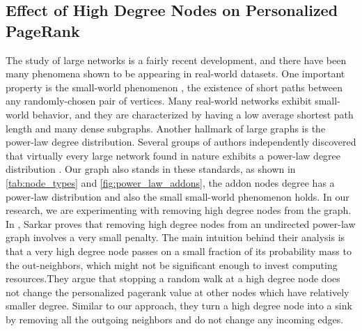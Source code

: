 \documentclass[11pt,oneside]{book}
\let\Oldsubsection\subsection
\renewcommand{\subsection}{\FloatBarrier\Oldsubsection}
\begin{document}
\subsection{Effect of High Degree Nodes on Personalized PageRank}
\label{sec:ppr_high_degree}
The study of large networks is a fairly recent development, and there have been many phenomena shown to be appearing in real-world datasets. One important property is the small-world phenomenon \citep{watts1998collective}, the existence of short paths between any randomly-chosen pair of vertices. Many real-world networks exhibit small-world behavior, and they are characterized by having a low average shortest path length and many dense subgraphs.
Another hallmark of large graphs is the power-law degree distribution. Several groups of authors independently discovered that virtually every large network found in nature exhibits a power-law degree distribution \citep{aiello2001random,albert1999internet}. Our graph also stands in these standards, as shown in \autoref{tab:node_types} and \autoref{fig:power_law_addons}, the addon nodes degree has a power-law distribution and also the small small-world phenomenon holds. In our research, we are experimenting with removing high degree nodes from the graph. In \citep{sarkar2010tractable}, Sarkar proves that removing high degree nodes from an undirected power-law graph involves a very small penalty. The main intuition behind their analysis is that a very high degree node passes on a small fraction of its probability mass to the out-neighbors,
which might not be significant enough to invest computing resources.They argue that stopping a random walk at a high degree node does not change the personalized pagerank value at other nodes which have relatively smaller degree. Similar to our approach, they turn a high degree
node into a sink by removing all the outgoing neighbors and do not change any incoming edges.
\end{document}
